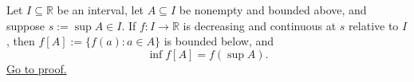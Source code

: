 \begin{theorem}
\label{thm:decreasing-image-supremum-to-infimum}
Let $I\subseteq\mathbb{R}$ be an interval, let $A\subseteq I$ be nonempty and
bounded above, and suppose $s:=\sup A\in I$.  If $f\colon I\to\mathbb{R}$ is
decreasing and continuous at $s$ relative to $I$, then
$f[A]:=\{f(a):a\in A\}$ is bounded below, and
\[
  \inf f[A]=f(\sup A).
\]
\hyperref[prf:decreasing-image-supremum-to-infimum]{Go to proof.}
\end{theorem}